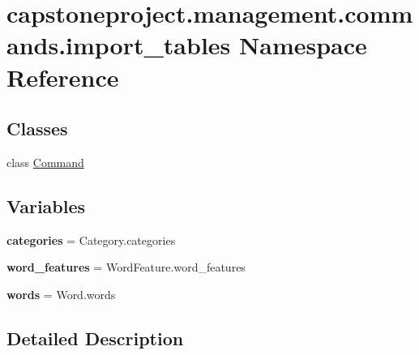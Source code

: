 \hypertarget{namespacecapstoneproject_1_1management_1_1commands_1_1import__tables}{}\section{capstoneproject.\+management.\+commands.\+import\+\_\+tables Namespace Reference}
\label{namespacecapstoneproject_1_1management_1_1commands_1_1import__tables}
\subsection*{Classes}
\begin{DoxyCompactItemize}
\item 
class \mbox{\hyperlink{classcapstoneproject_1_1management_1_1commands_1_1import__tables_1_1_command}{Command}}
\end{DoxyCompactItemize}
\subsection*{Variables}
\begin{DoxyCompactItemize}
\item 
\mbox{\label{namespacecapstoneproject_1_1management_1_1commands_1_1import__tables_a0ef53fac7eec3822f817005a2306edb9}} 
{\bfseries categories} = Category.\+categories
\item 
\mbox{\label{namespacecapstoneproject_1_1management_1_1commands_1_1import__tables_a17db7093dfe60cff70771cb83acedb59}} 
{\bfseries word\+\_\+features} = Word\+Feature.\+word\+\_\+features
\item 
\mbox{\label{namespacecapstoneproject_1_1management_1_1commands_1_1import__tables_a894bf927db00169e6ef8148de8b5d657}} 
{\bfseries words} = Word.\+words
\end{DoxyCompactItemize}


\subsection{Detailed Description}
 
